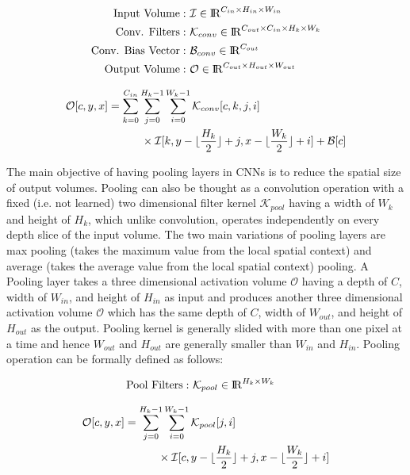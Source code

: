 \begin{align}
\text{Input Volume}:&~ \mathcal{I} \in \mathcal{\rm I\!R}^{C_{in} \times H_{in} \times W_{in}}\\
\text{Conv. Filters}:&~ \mathcal{K}_{conv} \in \mathcal{\rm I\!R}^{C_{out} \times C_{in} \times H_{k} \times W_{k}}\\
\text{Conv. Bias Vector}:&~ \mathcal{B}_{conv} \in \mathcal{\rm I\!R}^{C_{out}}\\
\text{Output Volume}:&~ \mathcal{O} \in \mathcal{\rm I\!R}^{C_{out} \times H_{out} \times W_{out}}
\end{align}

\begin{equation}
\label{eqn:conv_operator}
\begin{split}
\mathcal{O}[c,y,x] &= \sum_{k=0}^{C_{in}} \sum_{j=0}^{H_k-1} \sum_{i=0}^{W_k-1} \mathcal{K}_{conv}[c, k, j, i] \\ & \quad \quad \quad \times \mathcal{I}[k,y-\lfloor\frac{H_k}{2}\rfloor+j,x-\lfloor\frac{W_k}{2}\rfloor+i] + \mathcal{B}[c]
\end{split}
\end{equation}

The main objective of having pooling layers in CNNs is to reduce the spatial size of output volumes. Pooling can also be thought as a convolution operation with a fixed (i.e. not learned) two dimensional filter kernel $\mathcal{K}_{pool}$ having a width of $W_k$ and height of $H_k$, which unlike convolution, operates independently on every depth slice of the input volume. The two main variations of pooling layers are max pooling (takes the maximum value from the local spatial context) and average (takes the average value from the local spatial context) pooling. A Pooling layer takes a three dimensional activation volume $\mathcal{O}$ having a depth of $C$, width of $W_{in}$, and height of $H_{in}$ as input and produces another three dimensional activation volume $\mathcal{O}$ which has the same depth of $C$, width of $W_{out}$, and height of $H_{out}$ as the output. Pooling kernel is generally slided with more than one pixel at a time and hence $W_{out}$ and $H_{out}$ are generally smaller than $W_{in}$ and $H_{in}$. Pooling operation can be formally defined as follows:

\begin{align}
\text{Pool Filters}:&~ \mathcal{K}_{pool} \in \mathcal{\rm I\!R}^{H_{k} \times W_{k}}
\end{align}

\begin{equation}
\label{eqn:pool_operator}
\begin{split}
\mathcal{O}[c,y,x] &= \sum_{j=0}^{H_k-1} \sum_{i=0}^{W_k-1} \mathcal{K}_{pool}[j, i] \\ & \quad \quad \quad \times \mathcal{I}[c,y-\lfloor\frac{H_k}{2}\rfloor+j,x-\lfloor\frac{W_k}{2}\rfloor+i]
\end{split}
\end{equation}


